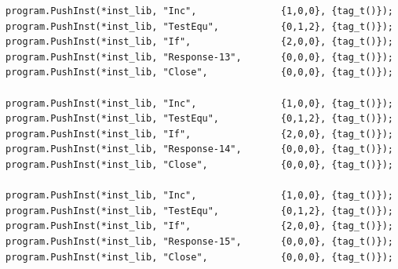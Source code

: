 \documentclass[]{book}
\begin{document}
\begin{verbatim}
program.PushInst(*inst_lib, "Inc",               {1,0,0}, {tag_t()});
program.PushInst(*inst_lib, "TestEqu",           {0,1,2}, {tag_t()});
program.PushInst(*inst_lib, "If",                {2,0,0}, {tag_t()});
program.PushInst(*inst_lib, "Response-13",       {0,0,0}, {tag_t()});
program.PushInst(*inst_lib, "Close",             {0,0,0}, {tag_t()});

program.PushInst(*inst_lib, "Inc",               {1,0,0}, {tag_t()});
program.PushInst(*inst_lib, "TestEqu",           {0,1,2}, {tag_t()});
program.PushInst(*inst_lib, "If",                {2,0,0}, {tag_t()});
program.PushInst(*inst_lib, "Response-14",       {0,0,0}, {tag_t()});
program.PushInst(*inst_lib, "Close",             {0,0,0}, {tag_t()});

program.PushInst(*inst_lib, "Inc",               {1,0,0}, {tag_t()});
program.PushInst(*inst_lib, "TestEqu",           {0,1,2}, {tag_t()});
program.PushInst(*inst_lib, "If",                {2,0,0}, {tag_t()});
program.PushInst(*inst_lib, "Response-15",       {0,0,0}, {tag_t()});
program.PushInst(*inst_lib, "Close",             {0,0,0}, {tag_t()});
\end{verbatim}


\end{document}
